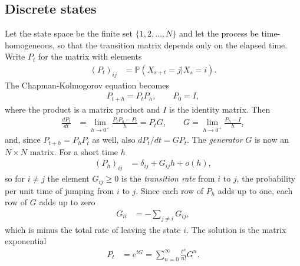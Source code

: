 \documentclass[11pt]{article}
\begin{document}
\subsection{Discrete states}
Let the state space be the finite set $\{1,2,\dots,N\}$ and let the process be time-homogeneous, so that the transition matrix depends only on the elapsed time. Write $P_t$ for the matrix with elements
\begin{align}
  (P_t)_{ij}&=\mathbb{P}(X_{s+t}=j|X_s=i).
\end{align}
The Chapman-Kolmogorov equation becomes
\begin{align}
  P_{t+h}=P_tP_h,\qquad P_0=I,
\end{align}
where the product is a matrix product and $I$ is the identity matrix. Then
\begin{align}
  \frac{dP_t}{dt}&=\lim_{h\rightarrow 0^+}\frac{P_tP_h-P_t}{h}=P_tG,\qquad G=\lim_{h\rightarrow 0^+}\frac{P_h-I}{h},
\end{align}
and, since $P_{t+h}=P_hP_t$ as well, also $dP_t/dt=GP_t$. The {\it generator} $G$ is now an $N\times N$ matrix. For a short time $h$
\begin{align}
  (P_h)_{ij}&=\delta_{ij}+G_{ij}h+o(h),
\end{align}
so for $i\neq j$ the element $G_{ij}\geq 0$ is the {\it transition rate} from $i$ to $j$, the probability per unit time of jumping from $i$ to $j$. Since each row of $P_h$ adds up to one, each row of $G$ adds up to zero
\begin{align}
  G_{ii}&=-\sum_{j\neq i}G_{ij},
\end{align}
which is minus the total rate of leaving the state $i$. The solution is the matrix exponential
\begin{align}
  P_t&=e^{tG}=\sum_{n=0}^{\infty}\frac{t^n}{n!}G^n.
\end{align}
\end{document}
